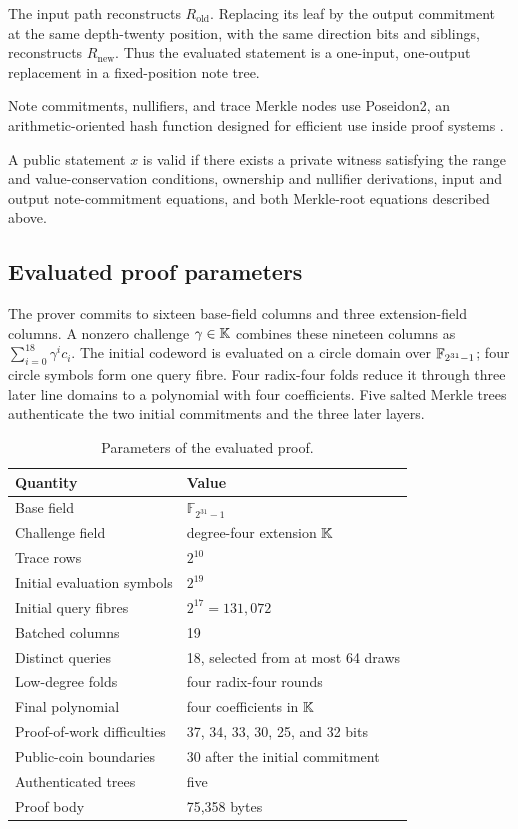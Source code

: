 The input path reconstructs \(R_{\mathrm{old}}\).  Replacing its leaf by the
output commitment at the same depth-twenty position, with the same direction
bits and siblings, reconstructs \(R_{\mathrm{new}}\).  Thus the evaluated
statement is a one-input, one-output replacement in a fixed-position note
tree.

Note commitments, nullifiers, and trace Merkle nodes use Poseidon2, an
arithmetic-oriented hash function designed for efficient use inside proof
systems \cite{GrassiKhovratovichSchofnegger2023Poseidon2}.

\begin{definition}
\label{def:spend}
A public statement \(x\) is valid if there exists a private witness satisfying
the range and value-conservation conditions, ownership and nullifier
derivations, input and output note-commitment equations, and both Merkle-root
equations described above.
\end{definition}

\subsection{Evaluated proof parameters}

The prover commits to sixteen base-field columns and three extension-field
columns.  A nonzero challenge \(\gamma\in\mathbb{K}\) combines these nineteen columns as
\(\sum_{i=0}^{18}\gamma^i c_i\).  The initial codeword is evaluated on a
circle domain over \(\mathbb{F}_{2^{31}-1}\); four circle symbols form one query fibre.  Four
radix-four folds reduce it through three later line domains to a polynomial
with four coefficients.  Five salted Merkle trees authenticate the two
initial commitments and the three later layers.

\begin{table}[t]
\centering
\small
\caption{Parameters of the evaluated proof.}
\label{tab:profile-parameters}
\begin{tabular}{@{}ll@{}}
\toprule
Quantity & Value \\
\midrule
Base field & \(\mathbb F_{2^{31}-1}\) \\
Challenge field & degree-four extension \(\mathbb{K}\) \\
Trace rows & \(2^{10}\) \\
Initial evaluation symbols & \(2^{19}\) \\
Initial query fibres & \(2^{17}=131{,}072\) \\
Batched columns & 19 \\
Distinct queries & 18, selected from at most 64 draws \\
Low-degree folds & four radix-four rounds \\
Final polynomial & four coefficients in \(\mathbb{K}\) \\
Proof-of-work difficulties & 37, 34, 33, 30, 25, and 32 bits \\
Public-coin boundaries & 30 after the initial commitment \\
Authenticated trees & five \\
Proof body & 75,358 bytes \\
\bottomrule
\end{tabular}
\end{table}

